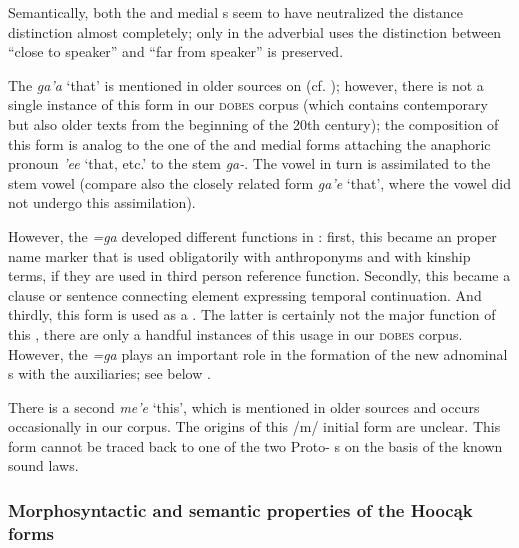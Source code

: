 \documentclass[output=paper]{langsci/langscibook}
\begin{document}
Semantically, both the  and medial s seem to have neutralized the  distance distinction almost completely; only in the adverbial uses the distinction between ``close to speaker'' and ``far from speaker'' is preserved. 


The  \textit{ga'a} `that' is mentioned in older sources on  (cf. \citealt[52]{Lipkind1945}); however, there is not a single instance of this form in our \textsc{dobes} corpus (which contains contemporary but also older texts from the beginning of the 20th century); the composition of this form is analog to the one of the  and medial forms attaching the anaphoric pronoun \textit{'ee} `that, etc.' to the   stem \textit{ga-}. The vowel in turn is assimilated to the stem vowel (compare also the closely related  form \textit{ga'e} `that', where the vowel did not undergo this assimilation).


However, the   \textit{=ga} developed different functions in : first, this  became an  proper name marker that is used obligatorily with anthroponyms and with kinship terms, if they are used in third person reference function.  Secondly, this   became a clause or sentence connecting element expressing temporal continuation. And thirdly, this form is used as a  . The latter is certainly not the major function of this , there are only a handful instances of this usage in our \textsc{dobes} corpus. However, the   \textit{=ga} plays an important role in the formation of the new adnominal s with the  auxiliaries; see below .


There is a second   \textit{me'e} `this', which is mentioned in older sources \citep[52]{Lipkind1945} and occurs occasionally in our corpus. The origins of this /m/ initial form are unclear. This form cannot be traced back to one of the two Proto-  s on the basis of the known sound laws. 


\subsubsection{{Morphosyntactic and semantic properties of the Hoocąk forms}}\label{sec:helmbrecht:3.2.2}
\end{document}
